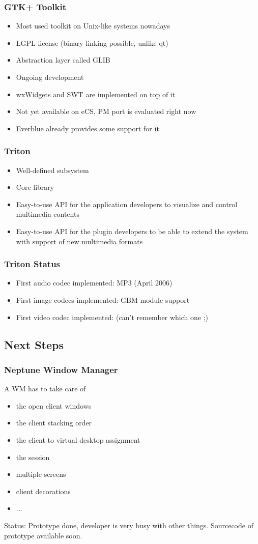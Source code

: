 \documentclass{beamer}
\begin{document}
\begin{frame}
\frametitle{GTK+ Toolkit}
\begin{itemize}[<+->]
  \item Most used toolkit on Unix-like systems nowadays
  \item LGPL license (binary linking possible, unlike qt)
  \item Abstraction layer called GLIB
  \item Ongoing development
  \item wxWidgets and SWT are implemented on top of it
  \item Not yet available on eCS, PM port is evaluated right now
  \item Everblue already provides some support for it
\end{itemize}
\end{frame}

\begin{frame}
\frametitle{Triton}
\begin{itemize}[<+->]
	\item Well-defined subsystem
	\item Core library
	\item Easy-to-use API for the application developers to visualize and control multimedia contents
	\item Easy-to-use API for the plugin developers to be able to extend the system with support of new multimedia formats
\end{itemize}
\end{frame}

\begin{frame}
\frametitle{Triton Status}
\begin{itemize}[<+->]
  \item First audio codec implemented: MP3 (April 2006)
  \item First image codecs implemented: GBM module support
  \item First video codec implemented: (can't remember which one ;)
\end{itemize}
\end{frame}


\subsection{Next Steps}

\begin{frame}
\frametitle{Neptune Window Manager}
A WM has to take care of
\begin{itemize}[<+->]
  \item the open client windows
  \item the client stacking order
  \item the client to virtual desktop assignment
  \item the session
  \item multiple screens
  \item client decorations
  \item ...
\end{itemize}
Status: Prototype done, developer is very busy with other things. Sourcecode
of prototype available soon.
\end{frame}
\end{document}
